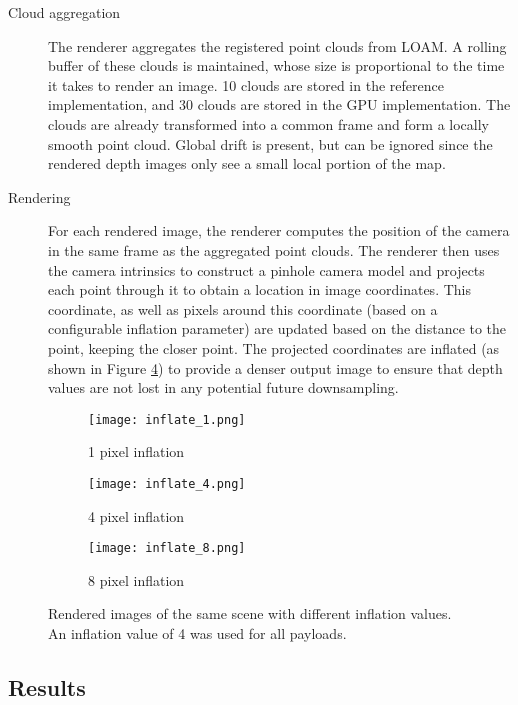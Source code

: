 \begin{description}
	\item[Cloud aggregation] The renderer aggregates the registered point clouds from LOAM. A rolling buffer of these clouds is maintained, whose size is proportional to the time it takes to render an image. 10 clouds are stored in the reference implementation, and 30 clouds are stored in the GPU implementation. The clouds are already transformed into a common frame and form a locally smooth point cloud. Global drift is present, but can be ignored since the rendered depth images only see a small local portion of the map.
	\item[Rendering] For each rendered image, the renderer computes the position of the camera in the same frame as the aggregated point clouds. The renderer then uses the camera intrinsics to construct a pinhole camera model and projects each point through it to obtain a location in image coordinates. This coordinate, as well as pixels around this coordinate (based on a configurable inflation parameter) are updated based on the distance to the point, keeping the closer point. The projected coordinates are inflated (as shown in Figure \ref{lidar_inflate}) to provide a denser output image to ensure that depth values are not lost in any potential future downsampling.
\end{description}

\begin{figure}
	\centering
	\begin{subfigure}{0.3\textwidth}
		\texttt{[image: inflate\_1.png]}
		\caption{1 pixel inflation}
		\label{inflate_1}
	\end{subfigure}		
	\hfill
	\begin{subfigure}{0.3\textwidth}
		\texttt{[image: inflate\_4.png]}
		\caption{4 pixel inflation}
		\label{inflate_4}		
	\end{subfigure}
	\hfill
	\begin{subfigure}{0.3\textwidth}
		\texttt{[image: inflate\_8.png]}
		\caption{8 pixel inflation}
		\label{inflate_8}
	\end{subfigure}
	\caption[LIDAR renderer inflation values comparison]{Rendered images of the same scene with different inflation values. An inflation value of 4 was used for all payloads.}
	\label{lidar_inflate}
\end{figure}

\subsection{Results}

